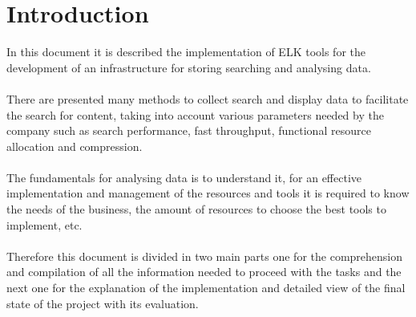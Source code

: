 
\chapter{Introduction} %

\label{ch:introduction} %


In this document it is described the implementation of ELK tools for the development of an infrastructure for storing searching and analysing data.\\
\\
There are presented many methods to collect search and display data to facilitate the search for content, taking into account various parameters needed by the company such as search performance, fast throughput, functional resource allocation and compression. \\
\\
The fundamentals for analysing data is to understand it, for an effective implementation and management of the resources and tools it is required to know the needs of the business, the amount of resources to choose the best tools to implement, etc.\\
\\
Therefore this document is divided in two main parts one for the comprehension and compilation of all the information needed to proceed with the tasks and the next one for the explanation of the implementation and detailed view of the final state of the project with its evaluation. \\ 
\\
